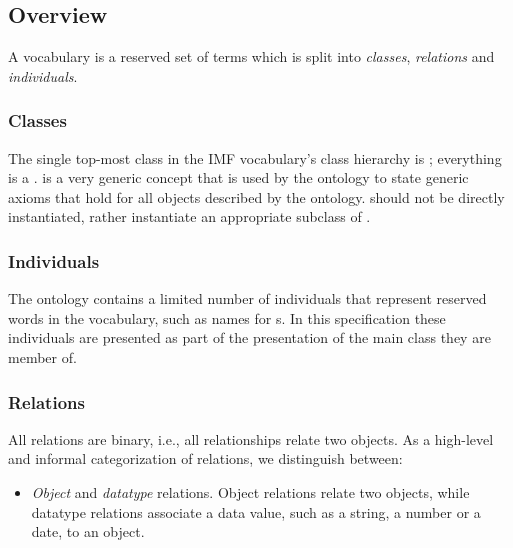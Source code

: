 \subsection{Overview}

A vocabulary is a reserved set of terms which is split into
\emph{classes}, \emph{relations} and \emph{individuals}.



\subsubsection{Classes}

The single top-most class in the IMF vocabulary's class hierarchy is ;
everything is a .
 is a very generic concept
that is used by the ontology to state generic axioms that hold
for all objects described by the ontology.
 should not be directly instantiated, rather instantiate an appropriate subclass of .



\subsubsection{Individuals}
\label{sec:individuals}

The ontology contains a limited number of individuals that represent
reserved words in the vocabulary, such as names for s.
In this specification these individuals are presented as part of the presentation of the main class they are member of.


\subsubsection{Relations}

All relations are binary, i.e., all relationships relate two objects. As a
high-level and informal categorization of relations, we distinguish
between:

\begin{itemize}
\item \emph{Object} and \emph{datatype} relations. Object relations
  relate two objects, while datatype relations associate a
  data value, such as a string, a number or a date, to an object.

\end{itemize}

